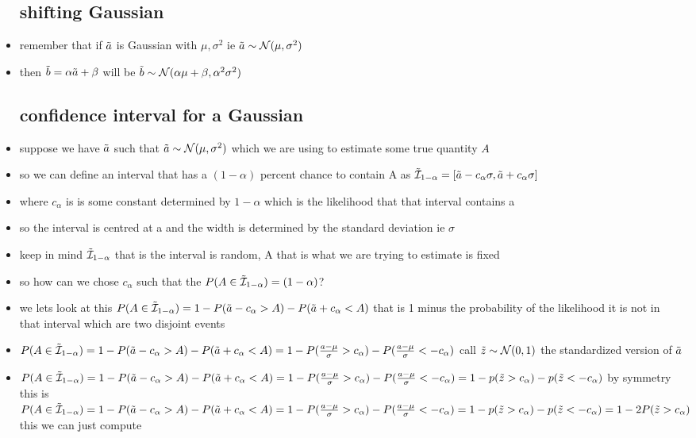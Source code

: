 \documentclass{article}
\begin{document}
\begin{itemize}
\subsection{shifting Gaussian}
\item remember that if $\Tilde{a}$ is Gaussian with $\mu, \sigma^{2}$ ie $\Tilde{a}\sim \mathcal{N}(\mu,\sigma^2)$
\item then $\Tilde{b}=\alpha \Tilde{a}+\beta$ will be $\Tilde{b}\sim \mathcal{N}(\alpha \mu+\beta, \alpha^2\sigma^2 )$
\subsection{confidence interval for a Gaussian }
\item suppose we have $\Tilde{a}$ such that $\Tilde{a}\sim \mathcal{N}(\mu,\sigma^2)$ which we are using to estimate some true quantity  $A$
\item so we can define an interval that has a $(1-\alpha)$ percent chance to contain A as $\Tilde{\mathcal{I}}_{1-\alpha}=[\Tilde{a}-c_{\alpha}\sigma,\Tilde{a}+c_{\alpha}\sigma]$ 
\item where $c_{\alpha}$ is  is some constant determined by $1-\alpha$ which is the likelihood that that interval contains a 
\item so the interval is centred at a and the width is determined by the standard deviation ie $\sigma$
\item keep in mind $\Tilde{\mathcal{I}}_{1-\alpha}$ that is the interval is random, A that is what we are trying to estimate is fixed
\item so how can we chose $c_{\alpha}$ such that the $P(A\in\Tilde{\mathcal{I}}_{1-\alpha})=(1-\alpha) $?
\item we lets look at this $P(A\in \Tilde{\mathcal{I}}_{1-\alpha})=1-P(\Tilde{a}-c_{\alpha}>A)- P(\Tilde{a}+c_{\alpha}<A)$ that is 1 minus the probability of the likelihood it is not in that interval which are two disjoint events 
\item $P(A\in \Tilde{\mathcal{I}}_{1-\alpha})=1-P(\Tilde{a}-c_{\alpha}>A)- P(\Tilde{a}+c_{\alpha}<A)=1-P(\frac{a-\mu}{\sigma}>c_{\alpha})-P(\frac{a-\mu}{\sigma}<-c_{\alpha})$ call $\Tilde{z}\sim \mathcal{N}(0,1)$ the standardized version of $\Tilde{a}$
\item $P(A\in \Tilde{\mathcal{I}}_{1-\alpha})=1-P(\Tilde{a}-c_{\alpha}>A)- P(\Tilde{a}+c_{\alpha}<A)=1-P(\frac{a-\mu}{\sigma}>c_{\alpha})-P(\frac{a-\mu}{\sigma}<-c_{\alpha})=1-p(\Tilde{z}>c_{\alpha})-p(\Tilde{z}<-c_{\alpha})$ by symmetry this is $P(A\in \Tilde{\mathcal{I}}_{1-\alpha})=1-P(\Tilde{a}-c_{\alpha}>A)- P(\Tilde{a}+c_{\alpha}<A)=1-P(\frac{a-\mu}{\sigma}>c_{\alpha})-P(\frac{a-\mu}{\sigma}<-c_{\alpha})=1-p(\Tilde{z}>c_{\alpha})-p(\Tilde{z}<-c_{\alpha})=1-2P(\Tilde{z}>c_{\alpha})$ this we can just compute 

\end{itemize}
\end{document}

